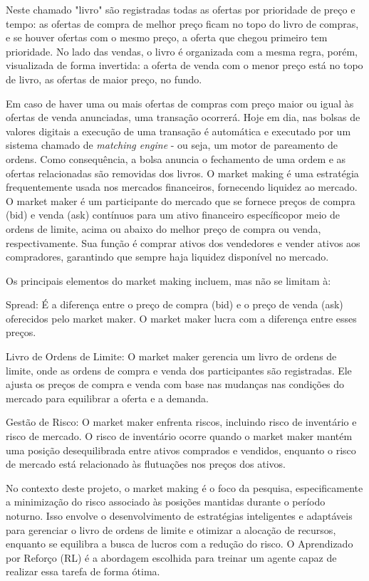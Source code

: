 Neste chamado "livro" são registradas todas as ofertas por prioridade de preço e tempo: as ofertas de compra de melhor preço ficam no topo do livro de compras, e se houver ofertas com o mesmo preço, a oferta que chegou primeiro tem prioridade. No lado das vendas, o livro é organizada com a mesma regra, porém, visualizada de forma invertida: a oferta de venda com o menor preço está no topo de livro, as ofertas de maior preço, no fundo.

Em caso de haver uma ou mais ofertas de compras com preço maior ou igual às ofertas de venda anunciadas, uma transação ocorrerá. Hoje em dia, nas bolsas de valores digitais a execução de uma transação é automática e executado por um sistema chamado de \textit{matching engine} - ou seja, um motor de pareamento de ordens.
Como consequência, a bolsa anuncia o fechamento de uma ordem e as ofertas relacionadas são removidas dos livros.
O market making é uma estratégia frequentemente usada nos mercados financeiros, fornecendo liquidez ao mercado.
O market maker é um participante do mercado que se fornece preços de compra (bid) e venda (ask) contínuos para um ativo financeiro específicopor meio de ordens de limite, acima ou abaixo do melhor preço de compra ou venda, respectivamente. Sua função é comprar ativos dos vendedores e vender ativos aos compradores, garantindo que sempre haja liquidez disponível no mercado.

Os principais elementos do market making incluem, mas não se limitam à:

Spread: É a diferença entre o preço de compra (bid) e o preço de venda (ask) oferecidos pelo market maker. O market maker lucra com a diferença entre esses preços.

Livro de Ordens de Limite: O market maker gerencia um livro de ordens de limite, onde as ordens de compra e venda dos participantes são registradas. Ele ajusta os preços de compra e venda com base nas mudanças nas condições do mercado para equilibrar a oferta e a demanda.

Gestão de Risco: O market maker enfrenta riscos, incluindo risco de inventário e risco de mercado. O risco de inventário ocorre quando o market maker mantém uma posição desequilibrada entre ativos comprados e vendidos, enquanto o risco de mercado está relacionado às flutuações nos preços dos ativos.

No contexto deste projeto, o market making é o foco da pesquisa, especificamente a minimização do risco associado às posições mantidas durante o período noturno. Isso envolve o desenvolvimento de estratégias inteligentes e adaptáveis para gerenciar o livro de ordens de limite e otimizar a alocação de recursos, enquanto se equilibra a busca de lucros com a redução do risco. O Aprendizado por Reforço (RL) é a abordagem escolhida para treinar um agente capaz de realizar essa tarefa de forma ótima.